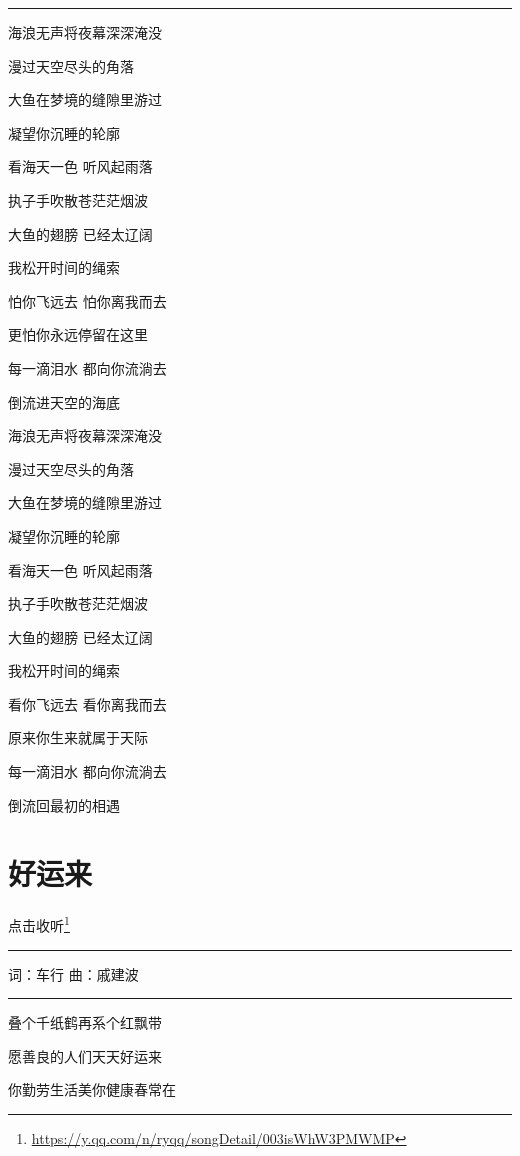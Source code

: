 \documentclass[]{ctexbook}
\renewcommand{\href}[2]{#2\footnote{\url{#1}}}
\begin{document}
\begin{center}\rule{0.5\linewidth}{0.5pt}\end{center}

海浪无声将夜幕深深淹没

漫过天空尽头的角落

大鱼在梦境的缝隙里游过

凝望你沉睡的轮廓

看海天一色 听风起雨落

执子手吹散苍茫茫烟波

大鱼的翅膀 已经太辽阔

我松开时间的绳索

怕你飞远去 怕你离我而去

更怕你永远停留在这里

每一滴泪水 都向你流淌去

倒流进天空的海底

海浪无声将夜幕深深淹没

漫过天空尽头的角落

大鱼在梦境的缝隙里游过

凝望你沉睡的轮廓

看海天一色 听风起雨落

执子手吹散苍茫茫烟波

大鱼的翅膀 已经太辽阔

我松开时间的绳索

看你飞远去 看你离我而去

原来你生来就属于天际

每一滴泪水 都向你流淌去

倒流回最初的相遇

\section*{好运来}\label{good-luck-comes}


\href{https://y.qq.com/n/ryqq/songDetail/003isWhW3PMWMP}{点击收听}

\begin{center}\rule{0.5\linewidth}{0.5pt}\end{center}

词：车行
曲：戚建波

\begin{center}\rule{0.5\linewidth}{0.5pt}\end{center}

叠个千纸鹤再系个红飘带

愿善良的人们天天好运来

你勤劳生活美你健康春常在
\end{document}

